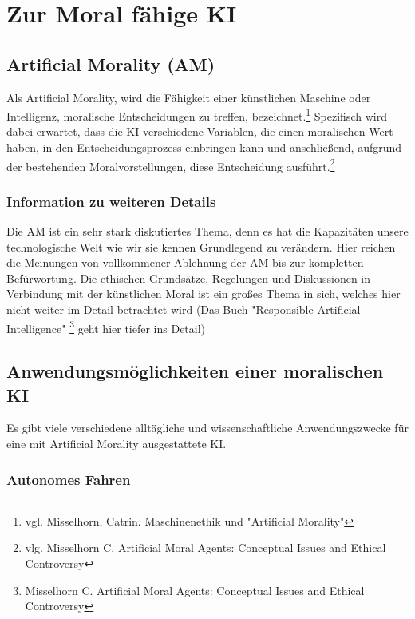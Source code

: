 \section{Zur Moral fähige KI}\label{sec::moralische KI}

\subsection{Artificial Morality (AM)}\label{subsec::artificial morality}

Als Artificial Morality, wird die Fähigkeit einer künstlichen Maschine oder Intelligenz, moralische Entscheidungen zu
treffen, bezeichnet.\footnote{vgl. Misselhorn, Catrin. Maschinenethik und "Artificial Morality"} Spezifisch
wird dabei erwartet, dass die KI verschiedene Variablen, die einen moralischen Wert haben, in den Entscheidungsprozess
einbringen kann und anschließend, aufgrund der bestehenden Moralvorstellungen, diese Entscheidung ausführt.\footnote{vlg. Misselhorn C. Artificial Moral Agents: Conceptual Issues and Ethical Controversy}

\subsubsection{Information zu weiteren Details}

Die AM ist ein sehr stark diskutiertes Thema, denn es hat die Kapazitäten unsere technologische Welt wie wir sie kennen
Grundlegend zu verändern.
Hier reichen die Meinungen von vollkommener Ablehnung der AM bis zur kompletten Befürwortung.
Die ethischen Grundsätze, Regelungen und Diskussionen in Verbindung mit der künstlichen Moral ist ein großes Thema
in sich, welches hier nicht weiter im Detail betrachtet wird (Das Buch "Responsible Artificial Intelligence"
\footnote{Misselhorn C. Artificial Moral Agents: Conceptual Issues and Ethical Controversy} geht hier tiefer ins Detail)

\subsection{Anwendungsmöglichkeiten einer moralischen KI}\label{subsec::anwendungen}

Es gibt viele verschiedene alltägliche und wissenschaftliche Anwendungszwecke für eine mit Artificial Morality ausgestattete KI\@.

\subsubsection{Autonomes Fahren}\label{subsubsec::autonomes fahren}

